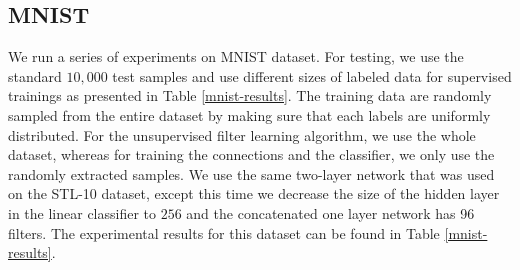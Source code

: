 \documentclass{article} \usepackage{iclr2016_workshop,times}
\begin{document}
\subsection{MNIST}
We run a series of experiments on MNIST dataset. For testing, we use the standard $10,000$ test samples and use different sizes of labeled data for supervised trainings as presented in Table \ref{mnist-results}. The training data are randomly sampled from the entire dataset by making sure that each labels are uniformly distributed.
For the unsupervised filter learning algorithm, we use the whole dataset, whereas for training the connections and the classifier, we only use the randomly extracted samples.
We use the same two-layer network that was used on the STL-10 dataset, except this time we decrease the size of the hidden layer in the linear classifier to $256$ and the concatenated one layer network has 96 filters. The experimental results for this dataset can be found in Table \ref{mnist-results}.
\end{document}
